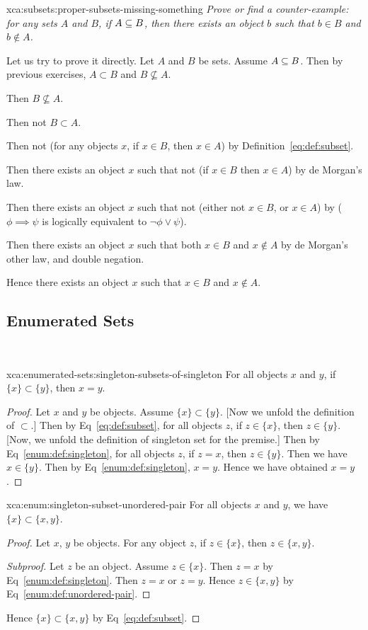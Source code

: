 \begin{solution}{xca:subsets:proper-subsets-missing-something}
\textit{Prove or find a counter-example: for any sets $A$ and $B$, if
$A\propersubset B$, then there exists an object $b$ such that $b\in B$
and $b\notin A$.}

Let us try to prove it directly.
Let $A$ and $B$ be sets. Assume $A\propersubset B$. Then by previous exercises, $A\subset B$ and $B\nsubseteq A$.

Then $B\nsubseteq A$.

Then not $B\subset A$.

Then not (for any objects $x$, if $x\in B$, then $x\in A$) by Definition~\eqref{eq:def:subset}.

Then there exists an object $x$ such that not (if $x\in B$ then $x\in A$)
by de Morgan's law.

Then there exists an object $x$ such that not (either not $x\in B$, or
$x\in A$) by ($\phi\implies\psi$ is logically equivalent to $\neg\phi\lor\psi$).

Then there exists an object $x$ such that both $x\in B$ and $x\notin A$
by de Morgan's other law, and double negation.

Hence there exists an object $x$ such that $x\in B$ and $x\notin A$.
\end{solution}


\subsection{Enumerated Sets} \

\begin{solution}{xca:enumerated-sets:singleton-subsets-of-singleton}
For all objects $x$ and $y$, if $\{x\}\subset\{y\}$, then $x=y$.

\begin{proof}
Let $x$ and $y$ be objects. Assume $\{x\}\subset\{y\}$. [Now we unfold
the definition of $\subset$.]
Then by Eq~\eqref{eq:def:subset}, for all objects $z$, if $z\in\{x\}$,
then $z\in\{y\}$. [Now, we unfold the definition of singleton set for the premise.]
Then by Eq~\eqref{enum:def:singleton}, for all objects $z$, if $z=x$,
then $z\in\{y\}$.
Then we have $x\in\{y\}$.
Then by Eq~\eqref{enum:def:singleton}, $x=y$.
Hence we have obtained $x=y$.
\end{proof}
\end{solution}

\begin{solution}{xca:enum:singleton-subset-unordered-pair}
For all objects $x$ and $y$, we have $\{x\}\subset\{x,y\}$.
\begin{proof}
Let $x$, $y$ be objects.
For any object $z$, if $z\in\{x\}$, then $z\in\{x,y\}$.
\begin{proof}[Subproof]
Let $z$ be an object. Assume $z\in\{x\}$. Then $z=x$ by Eq~\eqref{enum:def:singleton}.
Then $z=x$ or $z=y$.
Hence $z\in\{x,y\}$ by Eq~\eqref{enum:def:unordered-pair}.
\end{proof}
\noindent Hence $\{x\}\subset\{x,y\}$ by Eq~\eqref{eq:def:subset}.
\end{proof}
\end{solution}


